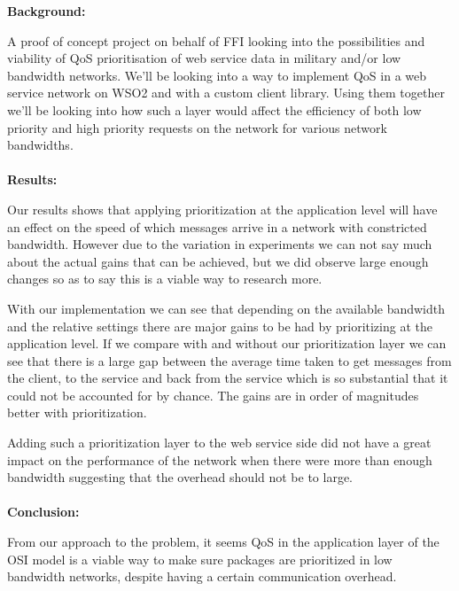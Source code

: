 {\bf Background:}

A proof of concept project on behalf of FFI looking into the possibilities and viability of QoS prioritisation of web service data in military and/or low bandwidth networks.
We’ll be looking into a way to implement QoS in a web service network on WSO2 and with a custom client library.
Using them together we’ll be looking into how such a layer would affect the efficiency of both low priority and high priority requests on the network for various network bandwidths.
\\\\
{\bf Results:}

Our results shows that applying prioritization at the application level will have an effect on the speed of which messages arrive in a network with constricted bandwidth. However due to the variation in experiments we can not say much about the actual gains that can be achieved, but we did observe large enough changes so as to say this is a viable way to research more.

With our implementation we can see that depending on the available bandwidth and the relative settings there are major gains to be had by prioritizing at the application level. If we compare with and without our prioritization layer we can see that there is a large gap between the average time taken to get messages from the client, to the service and back from the service which is so substantial that it could not be accounted for by chance. The gains are in order of magnitudes better with prioritization.

Adding such a prioritization layer to the web service side did not have a great impact on the performance of the network when there were more than enough bandwidth suggesting that the overhead should not be to large.
\\\\
{\bf Conclusion:}

From our approach to the problem, it seems QoS in the application layer of the OSI model is a viable way to make sure packages are prioritized in low bandwidth networks, despite having a certain communication overhead.